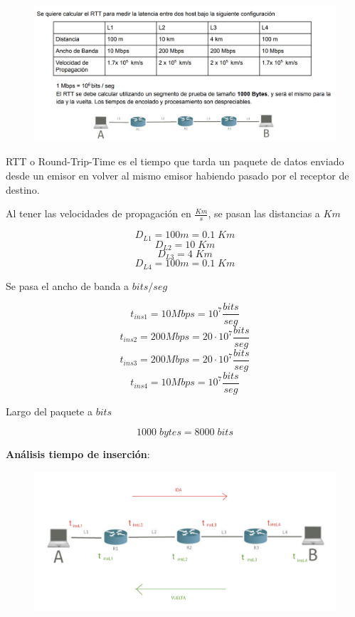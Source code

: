 \documentclass[titlepage,a4paper]{article}
\begin{document}
\begin{figure}[H]
\centering
\includegraphics[width=\textwidth]{ejercicioRtt.png}
\end{figure}


RTT o Round-Trip-Time es el tiempo que tarda un paquete de datos enviado desde un emisor en volver
al mismo emisor habiendo pasado por el receptor de destino.

Al tener las velocidades de propagación en $\frac{Km}{s}$, se pasan las distancias a $Km$

$$D_{L1} = 100 m = 0.1 \; Km$$
$$D_{L2} = 10 \; Km$$
$$D_{L3} = 4 \; Km$$
$$D_{L4} = 100 m = 0.1 \; Km$$

Se pasa el ancho de banda a $bits/seg$

$$t_{ins1} = 10 Mbps = 10^7 \frac{bits}{seg}$$
$$t_{ins2} = 200 Mbps = 20\cdot 10^7 \frac{bits}{seg}$$
$$t_{ins3} = 200 Mbps = 20\cdot 10^7 \frac{bits}{seg}$$
$$t_{ins4} = 10 Mbps = 10^7 \frac{bits}{seg}$$

Largo del paquete a $bits$

$$1000 \; bytes = 8000 \; bits$$

\textbf{Análisis tiempo de inserción}: \\


\begin{figure}[H]
\centering
\includegraphics[width=\textwidth]{tiempoInsercion.png}
\end{figure}
\end{document}
